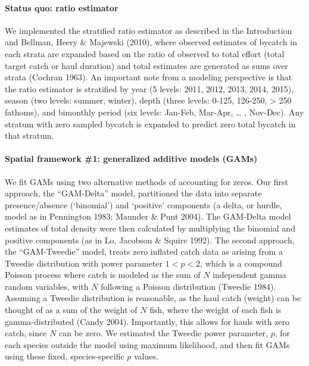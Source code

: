 \documentclass[]{article}
\let\oldparagraph\paragraph
\renewcommand{\paragraph}[1]{\oldparagraph{#1}\mbox{}}
\begin{document}
\hypertarget{status-quo-ratio-estimator}{%
\paragraph{Status quo: ratio
estimator}\label{status-quo-ratio-estimator}}

We implemented the stratified ratio estimator as described in the
Introduction and Bellman, Heery \& Majewski (2010), where observed
estimates of bycatch in each strata are expanded based on the ratio of
observed to total effort (total target catch or haul duration) and total
estimates are generated as sums over strata (Cochran 1963). An important
note from a modeling perspective is that the ratio estimator is
stratified by year (5 levels: 2011, 2012, 2013, 2014, 2015), season (two
levels: summer, winter), depth (three levels: 0-125, 126-250,
\textgreater{} 250 fathoms), and bimonthly period (six levels: Jan-Feb,
Mar-Apr, \ldots{} , Nov-Dec). Any stratum with zero sampled bycatch is
expanded to predict zero total bycatch in that stratum.

\hypertarget{spatial-framework-1-generalized-additive-models-gams}{%
\paragraph{Spatial framework \#1: generalized additive models
(GAMs)}\label{spatial-framework-1-generalized-additive-models-gams}}

We fit GAMs using two alternative methods of accounting for zeros. Our
first approach, the ``GAM-Delta'' model, partitioned the data into
separate presence/absence (`binomial') and `positive' components (a
delta, or hurdle, model as in Pennington 1983; Maunder \& Punt 2004).
The GAM-Delta model estimates of total density were then calculated by
multiplying the binomial and positive components (as in Lo, Jacobson \&
Squire 1992). The second approach, the ``GAM-Tweedie'' model, treats
zero inflated catch data as arising from a Tweedie distribution with
power parameter \(1 < p < 2\), which is a compound Poisson process where
catch is modeled as the sum of \(N\) independent gamma random variables,
with \(N\) following a Poisson distribution (Tweedie 1984). Assuming a
Tweedie distribution is reasonable, as the haul catch (weight) can be
thought of as a sum of the weight of \(N\) fish, where the weight of
each fish is gamma-distributed (Candy 2004). Importantly, this allows
for hauls with zero catch, since \(N\) can be zero. We estimated the
Tweedie power parameter, \(p\), for each species outside the model using
maximum likelihood, and then fit GAMs using these fixed,
species-specific \(p\) values.
\end{document}
